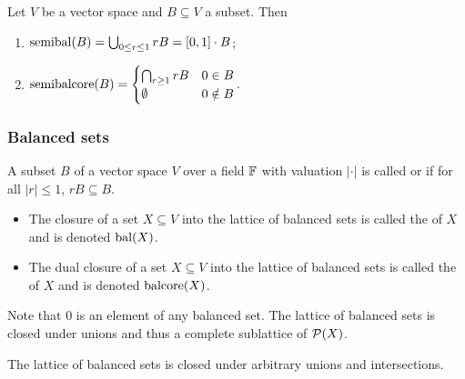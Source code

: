 \begin{lemma}
Let $V$ be a vector space and $B\subseteq V$ a subset. Then
\begin{enumerate}
\item $\semibalanced(B) = \bigcup_{0\leq r\leq 1}rB = \interval{0,1}\cdot B$;
\item $\operatorname{semibalcore}(B) = \begin{cases}
\bigcap_{r\geq 1}rB & 0\in B\\
\emptyset & 0\notin B
\end{cases}$.
\end{enumerate}
\end{lemma}

\subsubsection{Balanced sets}
\begin{definition}
A subset $B$ of a vector space $V$ over a field $\mathbb{F}$ with valuation $|\cdot|$ is called  or  if for all $|r|\leq 1$, $rB \subseteq B$.

\begin{itemize}
\item The closure of a set $X\subseteq V$ into the lattice of balanced sets is called the  of $X$ and is denoted $\operatorname{bal}(X)$.
\item The dual closure of a set $X\subseteq V$ into the lattice of balanced sets is called the  of $X$ and is denoted $\operatorname{balcore}(X)$.
\end{itemize}
\end{definition}
Note that $0$ is an element of any balanced set. The lattice of balanced sets is closed under unions and thus a complete sublattice of $\operatorname{\mathcal{P}}(X)$.

\begin{proposition}
The lattice of balanced sets is closed under arbitrary unions and intersections.
\end{proposition}

